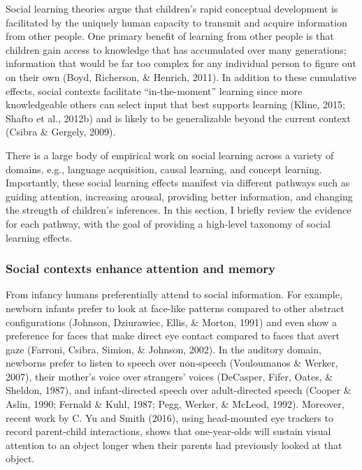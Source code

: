 \documentclass[english,floatsintext,man]{apa6}
\theoremstyle{definition}
\theoremstyle{definition}
\theoremstyle{definition}
\theoremstyle{remark}
\begin{document}
Social learning theories argue that children's rapid conceptual
development is facilitated by the uniquely human capacity to transmit
and acquire information from other people. One primary benefit of
learning from other people is that children gain access to knowledge
that has accumulated over many generations; information that would be
far too complex for any individual person to figure out on their own
(Boyd, Richerson, \& Henrich, 2011). In addition to these cumulative
effects, social contexts facilitate \enquote{in-the-moment} learning
since more knowledgeable others can select input that best supports
learning (Kline, 2015; Shafto et al., 2012b) and is likely to be
generalizable beyond the current context (Csibra \& Gergely, 2009).

There is a large body of empirical work on social learning across a
variety of domains, e.g., language acquisition, causal learning, and
concept learning. Importantly, these social learning effects manifest
via different pathways such as guiding attention, increasing arousal,
providing better information, and changing the strength of children's
inferences. In this section, I briefly review the evidence for each
pathway, with the goal of providing a high-level taxonomy of social
learning effects.

\subsubsection{Social contexts enhance attention and
memory}\label{social-contexts-enhance-attention-and-memory}

From infancy humans preferentially attend to social information. For
example, newborn infants prefer to look at face-like patterns compared
to other abstract configurations (Johnson, Dziurawiec, Ellis, \& Morton,
1991) and even show a preference for faces that make direct eye contact
compared to faces that avert gaze (Farroni, Csibra, Simion, \& Johnson,
2002). In the auditory domain, newborns prefer to listen to speech over
non-speech (Vouloumanos \& Werker, 2007), their mother's voice over
strangers' voices (DeCasper, Fifer, Oates, \& Sheldon, 1987), and
infant-directed speech over adult-directed speech (Cooper \& Aslin,
1990; Fernald \& Kuhl, 1987; Pegg, Werker, \& McLeod, 1992). Moreover,
recent work by C. Yu and Smith (2016), using head-mounted eye trackers
to record parent-child interactions, shows that one-year-olds will
sustain visual attention to an object longer when their parents had
previously looked at that object.
\end{document}
